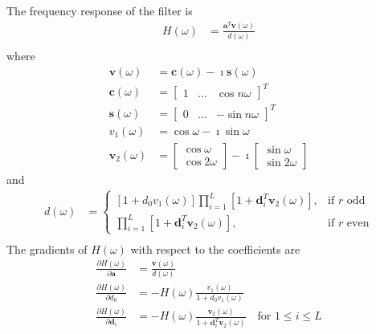 \documentclass[a4paper,twoside,10pt,english]{report}
\begin{document}
The frequency response of the filter is 
\begin{align*}
H\left(\omega\right) &=\frac{\boldsymbol{a}^{T}\boldsymbol{v}\left(\omega\right)}
{d\left(\omega\right)}\\
\end{align*}
where
\begin{align*}
\boldsymbol{v}\left(\omega\right) &= 
\boldsymbol{c}\left(\omega\right) - \imath\boldsymbol{s}\left(\omega\right)\\ 
\boldsymbol{c}\left(\omega\right) &= \left[\begin{array}{ccc}
1 & \hdots & \cos n\omega
\end{array}\right]^{T}\\
\boldsymbol{s}\left(\omega\right) &= \left[\begin{array}{ccc}
0 & \hdots & -\sin n\omega
\end{array}\right]^{T}\\
v_{1}\left(\omega\right) &= \cos \omega - \imath \sin\omega \\
\boldsymbol{v}_{2}\left(\omega\right) &= \left[\begin{array}{c}
\cos \omega\\
\cos 2\omega
\end{array}\right]-\imath\left[\begin{array}{c}
\sin \omega\\
\sin 2\omega
\end{array}\right]
\end{align*}
and
\begin{align*}
d\left(\omega\right) &= \begin{cases}
\left[1 + d_{0}v_{1}\left(\omega\right)\right]
\prod^{L}_{i=1}\left[1 + \boldsymbol{d}_{i}^{T}
\boldsymbol{v}_{2}\left(\omega\right)\right],&\text{if $r$ odd} \\
\prod^{L}_{i=1}\left[1 + \boldsymbol{d}_{i}^{T}
\boldsymbol{v}_{2}\left(\omega\right)\right],&\text{if $r$ even}
\end{cases}\\
\end{align*}
The gradients of $H\left(\omega\right)$ with respect to the coefficients are
\begin{align*}
\frac{\partial H\left(\omega\right)}{\partial\boldsymbol{a}}&=
\frac{\boldsymbol{v}\left(\omega\right)}{d\left(\omega\right)}\\
\frac{\partial H\left(\omega\right)}{\partial d_{0}}&=
-H\left(\omega\right)\frac{v_{1}\left(\omega\right)}
{1+d_{0}v_{1}\left(\omega\right)}\\
\frac{\partial H\left(\omega\right)}{\partial \boldsymbol{d}_{i}}&=
-H\left(\omega\right)\frac{\boldsymbol{v}_{2}\left(\omega\right)}
{1+\boldsymbol{d}_{i}^{T}\boldsymbol{v}_{2}\left(\omega\right)}\quad
\text{for $1\le i \le L$}
\end{align*}
\end{document}
